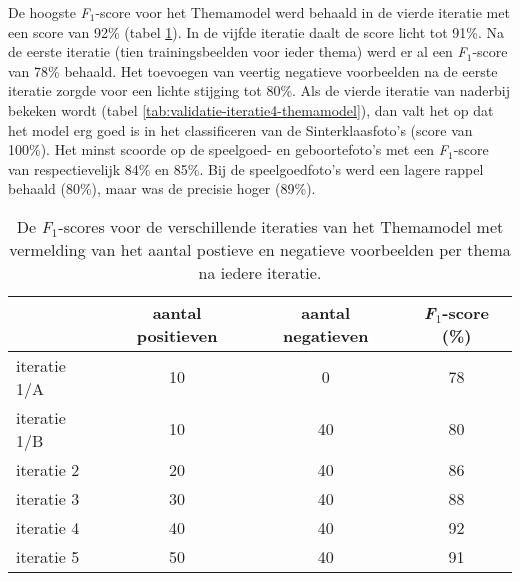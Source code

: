 De hoogste \textit{F$_{1}$}-score voor het Themamodel werd behaald in de vierde iteratie met een score van 92\% (tabel \ref{tab:validatie-themamodel}). In de vijfde iteratie daalt de score licht tot 91\%. Na de eerste iteratie (tien trainingsbeelden voor ieder thema) werd er al een \textit{F$_{1}$}-score van 78\% behaald. Het toevoegen van veertig negatieve voorbeelden na de eerste iteratie zorgde voor een lichte stijging tot 80\%. Als de vierde iteratie van naderbij bekeken wordt (tabel \ref{tab:validatie-iteratie4-themamodel}), dan valt het op dat het model erg goed is in het classificeren van de Sinterklaasfoto’s (score van 100\%). Het minst scoorde op de speelgoed- en geboortefoto’s met een \textit{F$_{1}$}-score van respectievelijk 84\% en 85\%. Bij de speelgoedfoto’s werd een lagere rappel behaald (80\%), maar was de precisie hoger (89\%). 

\begin{table}
    \centering
    \renewcommand\arraystretch{1.2}
    \begin{tabular}{l|cc|c}
        \toprule
        & aantal positieven  &  aantal negatieven & \textit{F$_{1}$}-score (\%)\\
        \midrule
        iteratie 1/A & 10 & 0 & 78 \\
        iteratie 1/B & 10 & 40 & 80 \\
        iteratie 2 & 20 & 40 & 86 \\
        iteratie 3 & 30 & 40 & 88 \\
        iteratie 4 & 40 & 40 & 92 \\
        iteratie 5 & 50 & 40 & 91 \\
        \bottomrule
    \end{tabular}
    \caption[De \textit{F$_{1}$}-scores voor de verschillende iteraties van het Themamodel.]{De \textit{F$_{1}$}-scores voor de verschillende iteraties van het Themamodel met vermelding van het aantal postieve en negatieve voorbeelden per thema na iedere iteratie.}
    \label{tab:validatie-themamodel}
\end{table}


